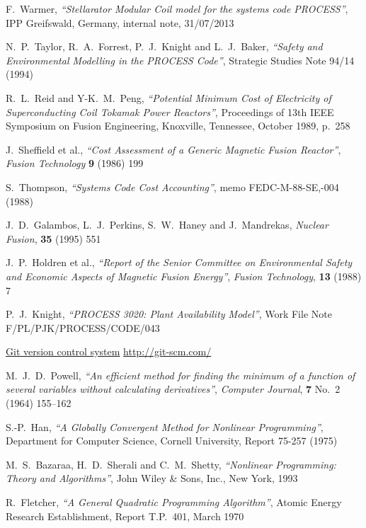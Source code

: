 \documentclass[11pt,a4paper]{report}
\begin{document}
\begin{thebibliography}{99}
F.\ Warmer,
\textit{``Stellarator Modular Coil model for the systems code PROCESS''},
IPP Greifswald, Germany, internal note, 31/07/2013


N.\ P.\ Taylor, R.\ A.\ Forrest, P.\ J.\ Knight and L.\ J.\ Baker,
\textit{``Safety and Environmental Modelling in the PROCESS Code''},
Strategic Studies Note 94/14 (1994)

R.\ L.\ Reid and Y-K.\ M.\ Peng,
\textit{``Potential Minimum Cost of Electricity of Superconducting Coil
Tokamak Power Reactors''},
Proceedings of 13th IEEE Symposium on Fusion Engineering, Knoxville,
Tennessee, October 1989, p.\ 258

J.\ Sheffield et al.,
\textit{``Cost Assessment of a Generic Magnetic Fusion Reactor''},
\textit{Fusion Technology} \textbf{9} (1986) 199

S.\ Thompson,
\textit{``Systems Code Cost Accounting''},
memo FEDC-M-88-SE,-004 (1988)

J.\ D.\ Galambos, L.\ J.\ Perkins, S.\ W.\ Haney and J.\ Mandrekas,
\textit{Nuclear Fusion}, \textbf{35} (1995) 551

J.\ P.\ Holdren et al.,
\textit{``Report of the Senior Committee on Environmental Safety and
Economic Aspects of Magnetic Fusion Energy''},
\textit{Fusion Technology}, \textbf{13} (1988) 7

P.\ J.\ Knight,
\textit{``PROCESS 3020: Plant Availability Model''},
Work File Note F/PL/PJK/PROCESS/CODE/043

\href{http://git-scm.com/}{Git version control system}
\url{http://git-scm.com/}

M.\ J.\ D.\ Powell,
\textit{``An efficient method for finding the minimum of a function of several
  variables without calculating derivatives''}, 
\textit{Computer Journal}, \textbf{7} No.\ 2 (1964) 155--162

S.-P.\ Han,
\textit{``A Globally Convergent Method for Nonlinear Programming''},
Department for Computer Science, Cornell University, Report 75-257 (1975)

M.\ S.\ Bazaraa, H.\ D.\ Sherali and C.\ M.\ Shetty,
\textit{``Nonlinear Programming: Theory and Algorithms''},
John Wiley \& Sons, Inc., New York, 1993

R.\ Fletcher,
\textit{``A General Quadratic Programming Algorithm''},
Atomic Energy Research Establishment, Report T.P.~401, March 1970


\end{thebibliography}
\end{document}

